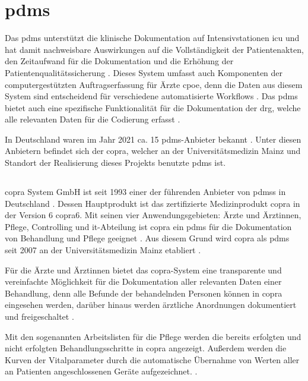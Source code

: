 \section{\acl{pdms}} \label{sec:pdms}

Das \acf{pdms} unterstützt die klinische Dokumentation auf Intensivstationen \glqq\acf{icu}\grqq{} und hat damit nachweisbare Auswirkungen auf die Vollständigkeit der Patientenakten, den Zeitaufwand für die Dokumentation und die Erhöhung der Patientenqualitätssicherung \cite{pdmsfinanc, pdmsimplem, pdmsicu}. Dieses System umfasst auch Komponenten der computergestützten Auftragserfassung für Ärzte \glqq\ac{cpoe}\grqq{}, denn die Daten aus diesem System sind entscheidend für verschiedene automatisierte Workflows \cite{pdmsfinanc, pdmsicu}. Das \ac{pdms} bietet auch eine spezifische Funktionalität für die Dokumentation der \ac{drg}, welche alle relevanten Daten für die Codierung erfasst \cite{pdmsfinanc, pdmsimplem}.

In Deutschland waren im Jahr 2021 ca. 15 \ac{pdms}-Anbieter bekannt \cite{pdmsgermany}. Unter diesen Anbietern befindet sich der \acf{copra}, welcher an der Universitätsmedizin Mainz und Standort der Realisierung dieses Projekts benutzte \ac{pdms} ist.

\subsection{}

\acs{copra} System GmbH ist seit 1993 einer der führenden Anbieter von \acp{pdms} in Deutschland \cite{copradosing, copra}. Dessen Hauptprodukt ist das zertifizierte Medizinprodukt \ac{copra} in der Version 6 \glqq\ac{copra}6\grqq{}. Mit seinen vier Anwendungsgebieten: Ärzte und Ärztinnen, Pflege, Controlling und \ac{it}-Abteilung ist \ac{copra} ein \ac{pdms} für die Dokumentation von Behandlung und Pflege geeignet \cite{copra}. Aus diesem Grund wird \ac{copra} als \ac{pdms} seit 2007 an der Universitätsmedizin Mainz etabliert \cite{copraplaces}.

Für die Ärzte und Ärztinnen bietet das \ac{copra}-System eine transparente und vereinfachte Möglichkeit für die Dokumentation aller relevanten Daten einer Behandlung, denn alle Befunde der behandelnden Personen können in \ac{copra} eingesehen werden, darüber hinaus werden ärztliche Anordnungen dokumentiert und freigeschaltet \cite{copra}.

Mit den sogenannten Arbeitslisten für die Pflege werden die bereits erfolgten und nicht erfolgten Behandlungsschritte in \ac{copra} angezeigt. Außerdem werden die Kurven der Vitalparameter durch die automatische Übernahme von Werten aller an Patienten angeschlossenen Geräte aufgezeichnet. \cite{copra}.

